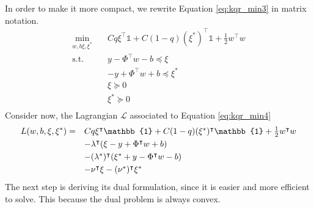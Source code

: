 In order to make it more compact, we rewrite Equation \ref{eq:kqr_min3} in matrix notation.
\begin{equation}\label{eq:kqr_min4}
    \begin{aligned}
        \min_{w,b\xi,\xi^*} \quad & C q \xi^\intercal \mathbb{1}+ C (1-q) (\xi^*)^\intercal \mathbb{1}+ \frac{1}{2}w^\intercal w\\
    \textrm{s.t.} \quad & y-\Phi^\intercal w -b \preceq \xi\\
    & -y+\Phi^\intercal w +b \preceq \xi^*\\
      &\xi\succeq0    \\
      &\xi^*\succeq0    \\
    \end{aligned}
    \end{equation}
Consider now, the Lagrangian $\mathcal{L}$ associated to Equation \ref{eq:kqr_min4}
\begin{equation}\label{eq:kqr_min5}
    \begin{split}
        L(w, b, \xi, \xi^*) = \quad & \hbox{$C q \xi^\intercal \mathbb{1} + C (1-q) (\xi^*)^\intercal \mathbb{1} + \frac{1}{2} w^\intercal w$} \\
        & \hbox{$- \lambda^\intercal (\xi - y + \Phi^\intercal w + b)$} \\
        & \hbox{$- (\lambda^*)^\intercal (\xi^* + y - \Phi^\intercal w - b)$} \\
        & \hbox{$- \nu^\intercal \xi - (\nu^*)^\intercal \xi^*$}
    \end{split}
\end{equation}
The next step is deriving its dual formulation, since it is easier and more efficient to solve. This because the dual problem is always convex.

